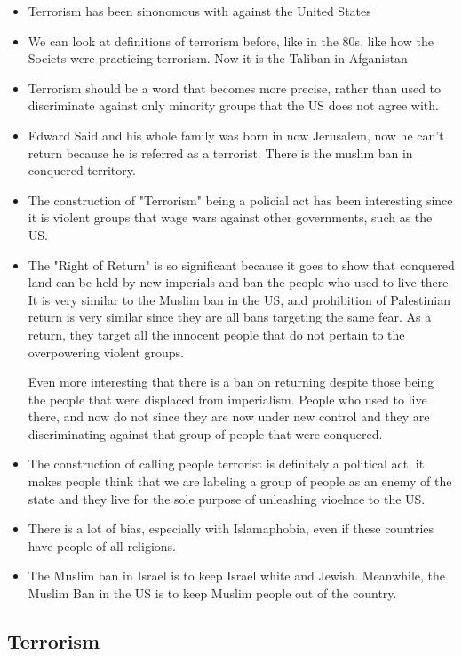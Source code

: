 \documentclass{article}
\begin{document}
\begin{itemize}
  \item Terrorism has been sinonomous with against the United States
  \item We can look at definitions of terrorism before, like in the 80s, like how the
    Societs were practicing terrorism. Now it is the Taliban in Afganistan
  \item Terrorism should be a word that becomes more precise, rather
    than used to discriminate against only minority groups that the US
    does not agree with.
  \item Edward Said and his whole family was born in now Jerusalem,
    now he can't return because he is referred as a terrorist.
    There is the muslim ban in conquered territory.
  \item The construction of "Terrorism" being a policial act has been interesting since
    it is violent groups that wage wars against other governments, such as the US.
  \item The "Right of Return" is so significant because it goes to show that conquered land
    can be held by new imperials and ban the people who used to live there.
    It is very similar to the Muslim ban in the US, and prohibition of Palestinian return
    is very similar since they are all bans targeting the same fear. As a return, they
    target all the innocent people that do not pertain to the overpowering violent groups.

    Even more interesting that there is a ban on returning despite 
    those being the people that were displaced
    from imperialism. People who used to live there, and now do not
    since they are now under new control and they are discriminating against that
    group of people that were conquered.
  \item The construction of calling people terrorist is definitely a political act,
    it makes people think that we are labeling a group of people as an enemy of the state
    and they live for the sole purpose of unleashing vioelnce to the US.
  \item There is a lot of bias, especially with Islamaphobia, even if these countries
    have people of all religions.
  \item The Muslim ban in Israel is to keep Israel white and Jewish. Meanwhile,
    the Muslim Ban in the US is to keep Muslim people out of the country.
\end{itemize}

\subsection{Terrorism}
\end{document}
